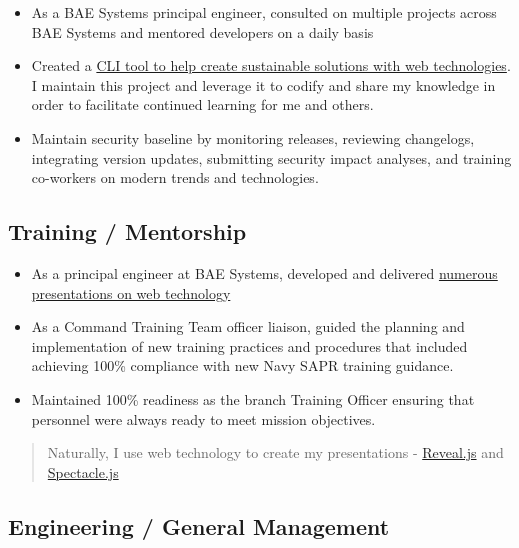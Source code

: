 \documentclass[10pt]{article}
\def\tightlist{}
\begin{document}
\begin{itemize}
\tightlist
\item
  As a BAE Systems principal engineer, consulted on multiple projects
  across BAE Systems and mentored developers on a daily basis
\item
  Created a \href{https://github.com/jhwohlgemuth/tomo-cli}{CLI tool to
  help create sustainable solutions with web technologies}. I maintain
  this project and leverage it to codify and share my knowledge in order
  to facilitate continued learning for me and others.
\item
  Maintain security baseline by monitoring releases, reviewing
  changelogs, integrating version updates, submitting security impact
  analyses, and training co-workers on modern trends and technologies.
\end{itemize}

\hypertarget{training-mentorship}{%
\subsection{Training / Mentorship}\label{training-mentorship}}

\begin{itemize}
\tightlist
\item
  As a principal engineer at BAE Systems, developed and delivered
  \href{https://github.com/jhwohlgemuth?utf8=\%E2\%9C\%93\&tab=repositories\&q=slides\&type=source\&language=}{numerous
  presentations on web technology}
\item
  As a Command Training Team officer liaison, guided the planning and
  implementation of new training practices and procedures that included
  achieving 100\% compliance with new Navy SAPR training guidance.
\item
  Maintained 100\% readiness as the branch Training Officer ensuring
  that personnel were always ready to meet mission objectives.
\end{itemize}

\begin{quote}
Naturally, I use web technology to create my presentations -
\href{https://revealjs.com/\#/}{Reveal.js} and
\href{https://formidable.com/open-source/spectacle/}{Spectacle.js}
\end{quote}

\hypertarget{engineering-general-management}{%
\subsection{Engineering / General
Management}\label{engineering-general-management}}
\end{document}

